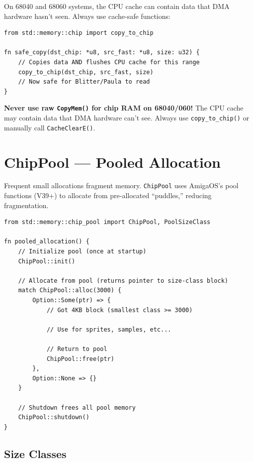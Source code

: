 On 68040 and 68060 systems, the CPU cache can contain data that DMA hardware hasn't seen. Always use cache-safe functions:

\begin{lstlisting}
from std::memory::chip import copy_to_chip

fn safe_copy(dst_chip: *u8, src_fast: *u8, size: u32) {
    // Copies data AND flushes CPU cache for this range
    copy_to_chip(dst_chip, src_fast, size)
    // Now safe for Blitter/Paula to read
}
\end{lstlisting}

\begin{warningbox}
\textbf{Never use raw \texttt{CopyMem()} for chip RAM on 68040/060!} The CPU cache may contain data that DMA hardware can't see. Always use \texttt{copy\_to\_chip()} or manually call \texttt{CacheClearE()}.
\end{warningbox}

\section{ChipPool --- Pooled Allocation}
\label{sec:chip-pool}

Frequent small allocations fragment memory. \texttt{ChipPool} uses AmigaOS's pool functions (V39+) to allocate from pre-allocated ``puddles,'' reducing fragmentation.

\begin{lstlisting}
from std::memory::chip_pool import ChipPool, PoolSizeClass

fn pooled_allocation() {
    // Initialize pool (once at startup)
    ChipPool::init()

    // Allocate from pool (returns pointer to size-class block)
    match ChipPool::alloc(3000) {
        Option::Some(ptr) => {
            // Got 4KB block (smallest class >= 3000)

            // Use for sprites, samples, etc...

            // Return to pool
            ChipPool::free(ptr)
        },
        Option::None => {}
    }

    // Shutdown frees all pool memory
    ChipPool::shutdown()
}
\end{lstlisting}

\subsection{Size Classes}

